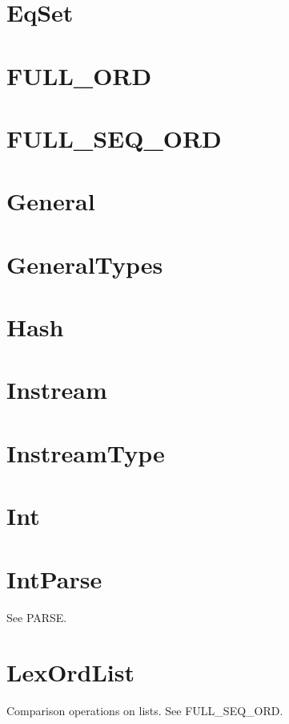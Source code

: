 \newpage
\section{EqSet}


\newpage
\section{FULL\_ORD}


\newpage
\section{FULL\_SEQ\_ORD}


\newpage
\section{General}


\newpage
\section{GeneralTypes}


\newpage
\section{Hash}


\newpage
\section{Instream}


\newpage
\section{InstreamType}


\newpage
\section{Int}


\newpage
\section{IntParse}
See PARSE.

\newpage
\section{LexOrdList}
Comparison operations on lists.  See FULL\_SEQ\_ORD.

